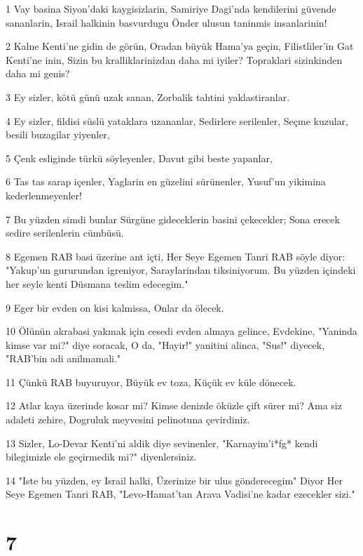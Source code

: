 \par 1 Vay basina Siyon'daki kaygisizlarin, Samiriye Dagi'nda kendilerini güvende sananlarin, Israil halkinin basvurdugu Önder ulusun taninmis insanlarinin!
\par 2 Kalne Kenti'ne gidin de görün, Oradan büyük Hama'ya geçin, Filistliler'in Gat Kenti'ne inin, Sizin bu kralliklarinizdan daha mi iyiler? Topraklari sizinkinden daha mi genis?
\par 3 Ey sizler, kötü günü uzak sanan, Zorbalik tahtini yaklastiranlar.
\par 4 Ey sizler, fildisi süslü yataklara uzananlar, Sedirlere serilenler, Seçme kuzular, besili buzagilar yiyenler,
\par 5 Çenk esliginde türkü söyleyenler, Davut gibi beste yapanlar,
\par 6 Tas tas sarap içenler, Yaglarin en güzelini sürünenler, Yusuf'un yikimina kederlenmeyenler!
\par 7 Bu yüzden simdi bunlar Sürgüne gideceklerin basini çekecekler; Sona erecek sedire serilenlerin cümbüsü.
\par 8 Egemen RAB basi üzerine ant içti, Her Seye Egemen Tanri RAB söyle diyor: "Yakup'un gururundan igreniyor, Saraylarindan tiksiniyorum. Bu yüzden içindeki her seyle kenti Düsmana teslim edecegim."
\par 9 Eger bir evden on kisi kalmissa, Onlar da ölecek.
\par 10 Ölünün akrabasi yakmak için cesedi evden almaya gelince, Evdekine, "Yaninda kimse var mi?" diye soracak, O da, "Hayir!" yanitini alinca, "Sus!" diyecek, "RAB'bin adi anilmamali."
\par 11 Çünkü RAB buyuruyor, Büyük ev toza, Küçük ev küle dönecek.
\par 12 Atlar kaya üzerinde kosar mi? Kimse denizde öküzle çift sürer mi? Ama siz adaleti zehire, Dogruluk meyvesini pelinotuna çevirdiniz.
\par 13 Sizler, Lo-Devar Kenti'ni aldik diye sevinenler, "Karnayim'i*fg* kendi bilegimizle ele geçirmedik mi?" diyenlersiniz.
\par 14 "Iste bu yüzden, ey Israil halki, Üzerinize bir ulus gönderecegim" Diyor Her Seye Egemen Tanri RAB, "Levo-Hamat'tan Arava Vadisi'ne kadar ezecekler sizi."

\chapter{7}

